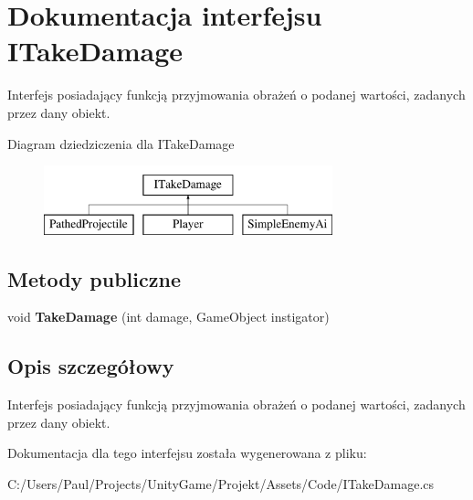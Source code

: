 \section{Dokumentacja interfejsu I\+Take\+Damage}
\label{interface_i_take_damage}


Interfejs posiadający funkcją przyjmowania obrażeń o podanej wartości, zadanych przez dany obiekt.  


Diagram dziedziczenia dla I\+Take\+Damage\begin{figure}[H]
\begin{center}
\leavevmode
\includegraphics[height=2.000000cm]{interface_i_take_damage}
\end{center}
\end{figure}
\subsection*{Metody publiczne}
\begin{DoxyCompactItemize}
\item 
void {\bfseries Take\+Damage} (int damage, Game\+Object instigator)\label{interface_i_take_damage_a433efa6ef27b7969d7799b46c1ec1949}

\end{DoxyCompactItemize}


\subsection{Opis szczegółowy}
Interfejs posiadający funkcją przyjmowania obrażeń o podanej wartości, zadanych przez dany obiekt. 



Dokumentacja dla tego interfejsu została wygenerowana z pliku\+:\begin{DoxyCompactItemize}
\item 
C\+:/\+Users/\+Paul/\+Projects/\+Unity\+Game/\+Projekt/\+Assets/\+Code/I\+Take\+Damage.\+cs\end{DoxyCompactItemize}
